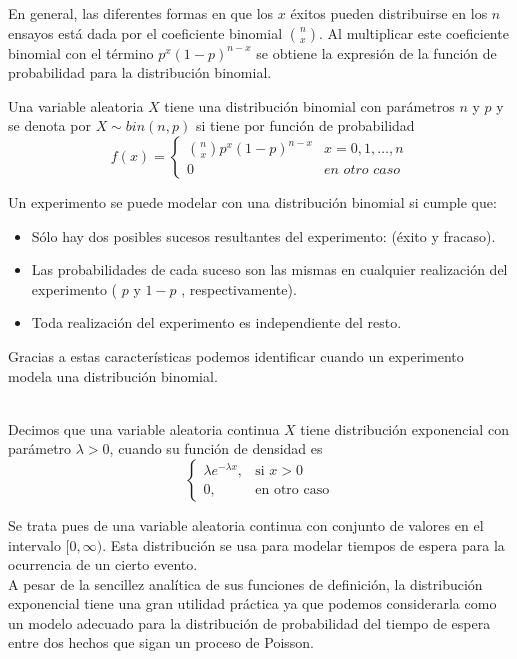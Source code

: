 En general, las diferentes formas en que los $x$ éxitos pueden distribuirse en los $n$ ensayos está dada por el coeficiente binomial $n\choose x$. Al multiplicar este coeficiente binomial con el término $p^x(1-p)^{n-x}$ se obtiene la expresión de la función de probabilidad para la distribución binomial.
\begin{Def}
    Una variable aleatoria $X$ tiene una distribución binomial con parámetros $n$ y $p$ y se denota por $X\sim bin(n,p)$ si tiene por función de probabilidad
    $$f(x)=
    \begin{cases}
        {n \choose x} p^x(1-p)^{n-x}& x=0,1,\ldots,n\\0 & \textit{en otro caso}
    \end{cases}$$
\end{Def}
Un experimento se puede modelar con una distribución binomial si cumple que:
\begin{itemize}
    \item Sólo hay dos posibles sucesos resultantes del experimento:
    (éxito y fracaso).
    \item Las probabilidades de cada suceso son las mismas en cualquier realización del experimento ( $p$ y $1-p$ , respectivamente).
    \item Toda realización del experimento es independiente del resto.
\end{itemize}
Gracias a estas características podemos identificar cuando un experimento modela una distribución binomial.\\\\
\begin{Def}
    Decimos que una variable aleatoria continua $X$ tiene distribución exponencial con parámetro $\lambda>0$, cuando su función de densidad es
    $$\begin{cases}
        \lambda e^{-\lambda x}, & \mbox{si $x>0$}\\
        0, & \mbox{en otro caso}
    \end{cases}
    $$
\end{Def}
Se trata pues de una variable aleatoria continua con conjunto de valores en el intervalo $[0,\infty)$. Esta distribución se usa para modelar tiempos de espera para la ocurrencia de un cierto evento.\\
A pesar de la sencillez analítica de sus funciones de definición, la distribución exponencial tiene una gran utilidad práctica ya que podemos considerarla como un modelo adecuado para la distribución de probabilidad del tiempo de espera entre dos hechos que sigan un proceso de Poisson.\\
